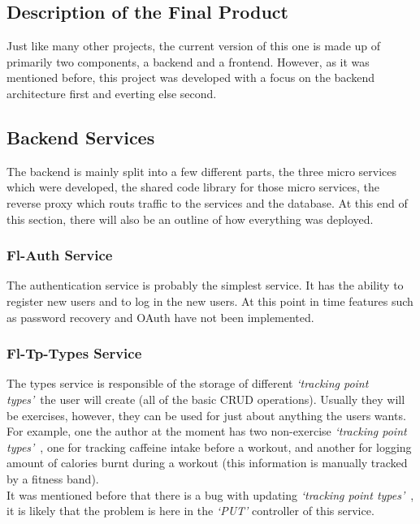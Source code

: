 \documentclass{article}
\newcommand{\vspaceconst}{-2ex}
\newcommand{\tpts}{\textit{`tracking point types'}}
\begin{document}
\begin{multicols}{2}
\section{Description of the Final Product}
\vspace{\vspaceconst}

Just like many other projects, the current version of this one is made up of primarily two components, a backend and a frontend. However, as it was mentioned before, this project was developed with a focus on the backend architecture first and everting else second. 

\subsection{Backend Services}
\vspace{\vspaceconst}

The backend is mainly split into a few different parts, the three micro services which were developed, the shared code library for those micro services, the reverse proxy which routs traffic to the services and the database. At this end of this section, there will also be an outline of how everything was deployed.

\subsubsection{Fl-Auth Service}
\vspace{\vspaceconst}

The authentication service is probably the simplest service. It has the ability to register new users and to log in the new users. At this point in time features such as password recovery and OAuth have not been implemented.

\subsubsection{Fl-Tp-Types Service}
\vspace{\vspaceconst}

The types service is responsible of the storage of different \tpts~the user will create (all of the basic CRUD operations). Usually they will be exercises, however, they can be used for just about anything the users wants. For example, one the author at the moment has two non-exercise \tpts~, one for tracking caffeine intake before a workout, and another for logging amount of calories burnt during a workout (this information is manually tracked by a fitness band).\\
It was mentioned before that there is a bug with updating \tpts~, it is likely that the problem is here in the \textit{`PUT'} controller of this service.\\


\end{multicols}
\end{document}
